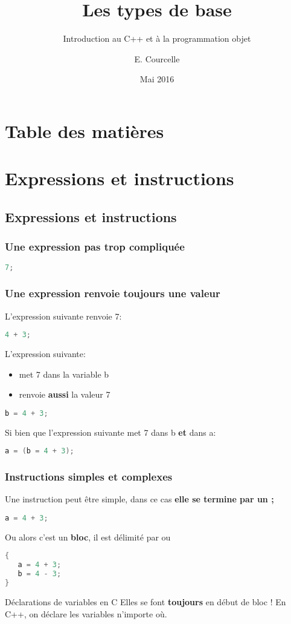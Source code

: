 \documentclass{beamer}
\title{Les types de base}
\subtitle{Introduction au C++ et à la programmation objet}
\author{E. Courcelle}\institute{CALMIP, UMS 3669}
\date{Mai 2016}
\begin{document}
\begin{frame}
\titlepage
\end{frame}

\section*{Table des matières}
\begin{frame}
\tableofcontents
\end{frame}

\section{Expressions et instructions}

\subsection{Expressions et instructions}

\begin{frame}[fragile=singleslide,shrink=20]
\frametitle {Une expression pas trop compliquée}
\begin{lstlisting}[language=c++]
7;
\end{lstlisting}
\end{frame}

\begin{frame}[fragile=singleslide,shrink=20]
\frametitle {Une expression renvoie toujours une valeur}
L'expression suivante renvoie 7:
\begin{lstlisting}[language=c++]
4 + 3;
\end{lstlisting}

L'expression suivante:
\begin{itemize}
\item{met 7 dans la variable b}
\item{renvoie \textbf{aussi} la valeur 7}
\end{itemize}
\begin{lstlisting}[language=c++]
b = 4 + 3;
\end{lstlisting}

Si bien que l'expression suivante met 7 dans b \textbf{et} dans a:
\begin{lstlisting}[language=c++]
a = (b = 4 + 3);
\end{lstlisting}
\end{frame}

\begin{frame}[fragile=singleslide,shrink=20]
\frametitle {Instructions simples et complexes}
Une instruction peut être simple, dans ce cas \textbf{elle se termine par un ;}
\begin{lstlisting}[language=c++]
a = 4 + 3;
\end{lstlisting}
Ou alors c'est un \textbf{bloc}, il est délimité par { ou }
\begin{lstlisting}[language=c++]
{
   a = 4 + 3;
   b = 4 - 3;
}
\end{lstlisting}
\begin{block}{Déclarations de variables en C}
Elles se font \textbf{toujours} en début de bloc !
En C++, on déclare les variables n'importe où.
\end{block}
\end{frame}
\end{document}
